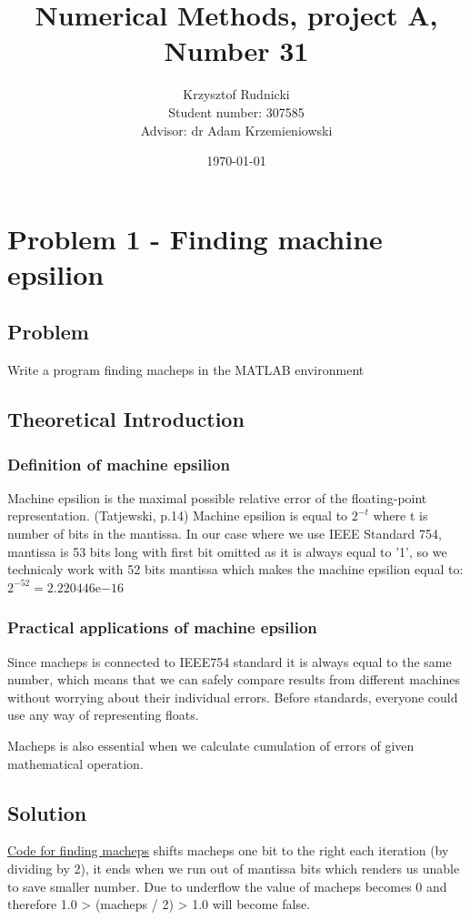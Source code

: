 \documentclass[12pt]{report}
\title{Numerical Methods, project A, Number 31}
\author{Krzysztof Rudnicki\\ Student number: 307585 \\ Advisor: dr Adam Krzemieniowski}
\date{\today}
\begin{document}
\maketitle
\tableofcontents

\chapter{Problem 1 - Finding machine epsilion}

\section{Problem}
Write a program finding macheps in the MATLAB environment
\section{Theoretical Introduction}
\subsection{Definition of machine epsilion}
Machine epsilion is the maximal possible relative error of the floating-point representation. (Tatjewski, p.14)
Machine epsilion is equal to $2^{-t}$ where t is number of bits in the mantissa.
In our case where we use IEEE Standard 754, mantissa is 53 bits long with first bit omitted as it is always equal to '1', so we technicaly work with 52 bits mantissa which makes the machine epsilion equal to: $2^{-52} = 2.220446\mathrm{e}{-16}$

\newpage
\subsection{Practical applications of machine epsilion}
Since macheps is connected to IEEE754 standard it is always equal to the same number, which means that we can safely compare results from different machines without worrying about their individual errors. Before standards, everyone could use any way of representing floats.

Macheps is also essential when we calculate cumulation of errors of given mathematical operation.

\newpage
\section{Solution}


\hyperlink{function1_macheps}{Code for finding macheps} shifts macheps one bit to the right each iteration (by dividing by 2), it ends when we run out of mantissa bits which renders us unable to save smaller number. Due to underflow the value of macheps becomes 0 and therefore 1.0 > (macheps / 2) > 1.0 will become false.
\newpage
\end{document}
